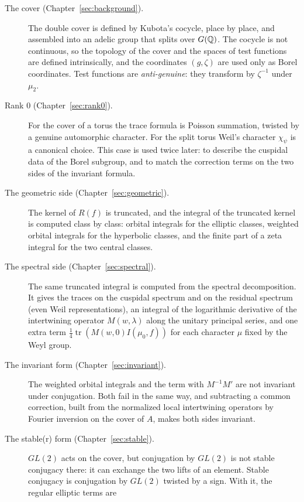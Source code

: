 \begin{description}
\item[The cover (Chapter~\ref{sec:background}).] The double cover is
  defined by Kubota's cocycle, place by place, and assembled into an
  adelic group that splits over $G(\mathbb{Q})$. The cocycle is not continuous,
  so the topology of the cover and the spaces of test functions are
  defined intrinsically, and the coordinates $(g,\zeta)$ are used only as
  Borel coordinates. Test functions are \emph{anti-genuine}: they
  transform by $\zeta^{-1}$ under $\mu_2$.
\item[Rank $0$ (Chapter~\ref{sec:rank0}).] For the cover of a torus the
  trace formula is Poisson summation, twisted by a genuine automorphic
  character. For the split torus Weil's character $\chi_\psi$ is a
  canonical choice. This case is used twice later: to describe the
  cuspidal data of the Borel subgroup, and to match the correction terms
  on the two sides of the invariant formula.
\item[The geometric side (Chapter~\ref{sec:geometric}).] The kernel of
  $R(f)$ is truncated, and the integral of the truncated kernel is
  computed class by class: orbital integrals for the elliptic classes,
  weighted orbital integrals for the hyperbolic classes, and the finite
  part of a zeta integral for the two central classes.
\item[The spectral side (Chapter~\ref{sec:spectral}).] The same
  truncated integral is computed from the spectral decomposition. It
  gives the traces on the cuspidal spectrum and on the residual spectrum
  (even Weil representations), an integral of the logarithmic derivative
  of the intertwining operator $M(w,\lambda)$ along the unitary principal
  series, and one extra term $\frac14\operatorname{tr}(M(w,0)I(\mu_0,f))$
  for each character $\mu$ fixed by the Weyl group.
\item[The invariant form (Chapter~\ref{sec:invariant}).] The weighted
  orbital integrals and the term with $M^{-1}M'$ are not invariant under
  conjugation. Both fail in the same way, and subtracting a common
  correction, built from the normalized local intertwining operators by
  Fourier inversion on the cover of $A$, makes both sides invariant.
\item[The stable(r) form (Chapter~\ref{sec:stable}).] $GL(2)$ acts on the
  cover, but conjugation by $GL(2)$ is not stable conjugacy there: it can
  exchange the two lifts of an element. Stable conjugacy is conjugation
  by $GL(2)$ twisted by a sign. With it, the regular elliptic terms are

\end{description}
